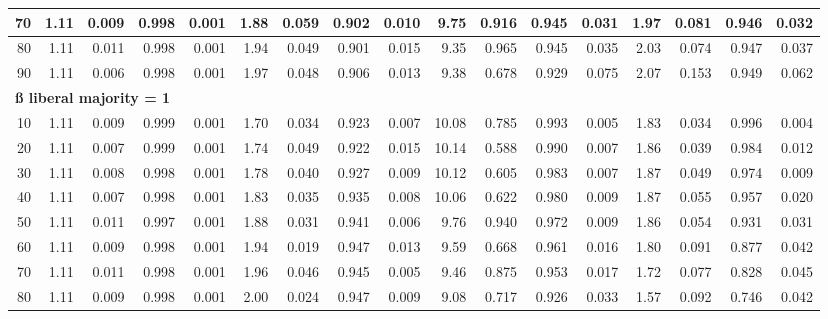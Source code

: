 \documentclass[
]{article}
\begin{document}
\begin{table}[H]
{\begin{tabular}{r|r|r|r|r|r|r|r|r|r|r|r|r|r|r|r|r}
\hline
\hspace{1em}70 & 1.11 & 0.009 & 0.998 & 0.001 & 1.88 & 0.059 & 0.902 & 0.010 & 9.75 & 0.916 & 0.945 & 0.031 & 1.97 & 0.081 & 0.946 & 0.032\\
\hline
\hspace{1em}80 & 1.11 & 0.011 & 0.998 & 0.001 & 1.94 & 0.049 & 0.901 & 0.015 & 9.35 & 0.965 & 0.945 & 0.035 & 2.03 & 0.074 & 0.947 & 0.037\\
\hline
\hspace{1em}90 & 1.11 & 0.006 & 0.998 & 0.001 & 1.97 & 0.048 & 0.906 & 0.013 & 9.38 & 0.678 & 0.929 & 0.075 & 2.07 & 0.153 & 0.949 & 0.062\\
\hline
\multicolumn{17}{l}{\textbf{ß liberal majority = 1}}\\
\hline
\hspace{1em}10 & 1.11 & 0.009 & 0.999 & 0.001 & 1.70 & 0.034 & 0.923 & 0.007 & 10.08 & 0.785 & 0.993 & 0.005 & 1.83 & 0.034 & 0.996 & 0.004\\
\hline
\hspace{1em}20 & 1.11 & 0.007 & 0.999 & 0.001 & 1.74 & 0.049 & 0.922 & 0.015 & 10.14 & 0.588 & 0.990 & 0.007 & 1.86 & 0.039 & 0.984 & 0.012\\
\hline
\hspace{1em}30 & 1.11 & 0.008 & 0.998 & 0.001 & 1.78 & 0.040 & 0.927 & 0.009 & 10.12 & 0.605 & 0.983 & 0.007 & 1.87 & 0.049 & 0.974 & 0.009\\
\hline
\hspace{1em}40 & 1.11 & 0.007 & 0.998 & 0.001 & 1.83 & 0.035 & 0.935 & 0.008 & 10.06 & 0.622 & 0.980 & 0.009 & 1.87 & 0.055 & 0.957 & 0.020\\
\hline
\hspace{1em}50 & 1.11 & 0.011 & 0.997 & 0.001 & 1.88 & 0.031 & 0.941 & 0.006 & 9.76 & 0.940 & 0.972 & 0.009 & 1.86 & 0.054 & 0.931 & 0.031\\
\hline
\hspace{1em}60 & 1.11 & 0.009 & 0.998 & 0.001 & 1.94 & 0.019 & 0.947 & 0.013 & 9.59 & 0.668 & 0.961 & 0.016 & 1.80 & 0.091 & 0.877 & 0.042\\
\hline
\hspace{1em}70 & 1.11 & 0.011 & 0.998 & 0.001 & 1.96 & 0.046 & 0.945 & 0.005 & 9.46 & 0.875 & 0.953 & 0.017 & 1.72 & 0.077 & 0.828 & 0.045\\
\hline
\hspace{1em}80 & 1.11 & 0.009 & 0.998 & 0.001 & 2.00 & 0.024 & 0.947 & 0.009 & 9.08 & 0.717 & 0.926 & 0.033 & 1.57 & 0.092 & 0.746 & 0.042\\

\end{tabular}}
\end{table}
\end{document}
